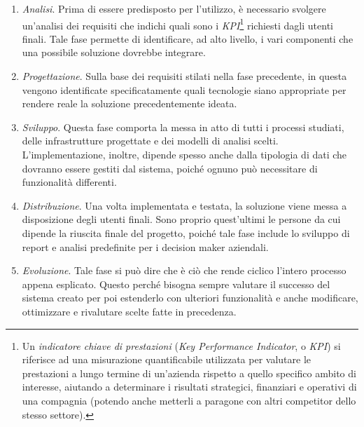 \begin{enumerate}
    \item \textit{Analisi}. Prima di essere predisposto per l'utilizzo, è necessario svolgere un'analisi dei requisiti che indichi quali sono i \textit{KPI}\footnote{Un \textit{indicatore chiave di prestazioni} (\textit{Key Performance Indicator}, o \textit{KPI}) si riferisce ad una misurazione quantificabile utilizzata per valutare le prestazioni a lungo termine di un'azienda rispetto a quello specifico ambito di interesse, aiutando a determinare i risultati strategici, finanziari e operativi di una compagnia (potendo anche metterli a paragone con altri competitor dello stesso settore).} richiesti dagli utenti finali. Tale fase permette di identificare, ad alto livello, i vari componenti che una possibile soluzione dovrebbe integrare.
    \item \textit{Progettazione}. Sulla base dei requisiti stilati nella fase precedente, in questa vengono identificate specificatamente quali tecnologie siano appropriate per rendere reale la soluzione precedentemente ideata.
    \item \textit{Sviluppo}. Questa fase comporta la messa in atto di tutti i processi studiati, delle infrastrutture progettate e dei modelli di analisi scelti. L'implementazione, inoltre, dipende spesso anche dalla tipologia di dati che dovranno essere gestiti dal sistema, poiché ognuno può necessitare di funzionalità differenti.
    \item \textit{Distribuzione}. Una volta implementata e testata, la soluzione viene messa a disposizione degli utenti finali. Sono proprio quest'ultimi le persone da cui dipende la riuscita finale del progetto, poiché tale fase include lo sviluppo di report e analisi predefinite per i decision maker aziendali.
    \item \textit{Evoluzione}. Tale fase si può dire che è ciò che rende ciclico l'intero processo appena esplicato. Questo perché bisogna sempre valutare il successo del sistema creato per poi estenderlo con ulteriori funzionalità e anche modificare, ottimizzare e rivalutare scelte fatte in precedenza.
\end{enumerate}

